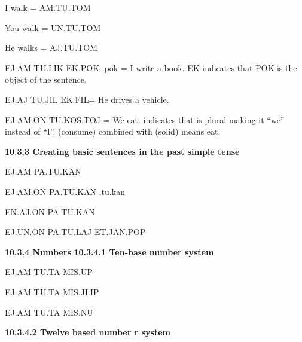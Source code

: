     I walk = AM.TU.TOM \am\tu\tom 

    You walk = UN.TU.TOM \un\tu\tom 

    He walks = AJ.TU.TOM \aj\tu\tom 

 

    EJ.AM TU.LIK EK.POK \ej\am \tu\lik \ek.pok = I write a book. 
    EK \ek indicates that POK \pok is the object of the sentence. 

    EJ.AJ TU.JIL EK.FIL\ej\aj \tu\jil \ek\fil = He drives a vehicle. 

    EJ.AM.ON TU.KOS.TOJ \ej\am\on \tu\kos\toj= We eat. 
    \on indicates that \am is plural making it “we” instead of “I”. \kos (consume) combined with \toj (solid) means eat. 

\noindent \textbf{10.3.3 Creating basic sentences in the past simple tense} 

    EJ.AM PA.TU.KAN \ej\am \pa\tu\kan 

    EJ.AM.ON PA.TU.KAN \ej\am\on \pa.tu.kan 

    EN.AJ.ON PA.TU.KAN \ej\aj\on \pa\tu\kan 

    EJ.UN.ON PA.TU.LAJ ET.JAN.POP \ej\un\on \pa\tu\laj  \et\jan\pop 

\noindent \textbf{10.3.4 Numbers} 
\noindent \textbf{10.3.4.1 Ten-base number system} 

    EJ.AM TU.TA MIS.UP \ej\am \tu\ta \mis\up 

    EJ.AM TU.TA MIS.JI.IP \ej\am \tu\ta \mis\ji\ip 

    EJ.AM TU.TA MIS.NU \ej\am \tu\ta \mis\nu 

 {\bf 10.3.4.2 Twelve based number r system} 

    \ej\am \tu\ta \mis\up 

    \ej\am \tu\ta \mis\jo 

    \ej\am \tu\ta \mis\uk\jo\ik 

    \ej\am \tu\ta \mis\nu
